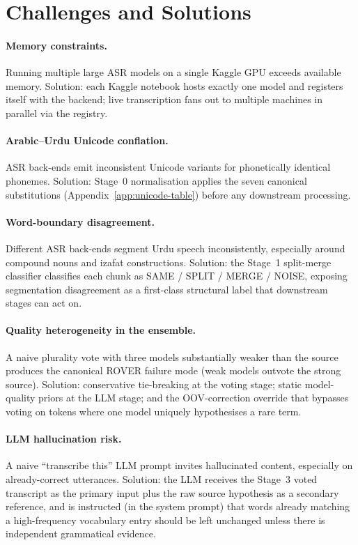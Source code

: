 \section{Challenges and Solutions}
\label{sec:challenges}

\paragraph{Memory constraints.}
Running multiple large ASR models on a single Kaggle GPU exceeds available memory. Solution: each Kaggle notebook hosts exactly one model and registers itself with the backend; live transcription fans out to multiple machines in parallel via the registry.

\paragraph{Arabic--Urdu Unicode conflation.}
ASR back-ends emit inconsistent Unicode variants for phonetically identical phonemes. Solution: Stage~0 normalisation applies the seven canonical substitutions (Appendix~\ref{app:unicode-table}) before any downstream processing.

\paragraph{Word-boundary disagreement.}
Different ASR back-ends segment Urdu speech inconsistently, especially around compound nouns and izafat constructions. Solution: the Stage~1 split-merge classifier classifies each chunk as SAME / SPLIT / MERGE / NOISE, exposing segmentation disagreement as a first-class structural label that downstream stages can act on.

\paragraph{Quality heterogeneity in the ensemble.}
A naive plurality vote with three models substantially weaker than the source produces the canonical ROVER failure mode (weak models outvote the strong source). Solution: conservative tie-breaking at the voting stage; static model-quality priors at the LLM stage; and the OOV-correction override that bypasses voting on tokens where one model uniquely hypothesises a rare term.

\paragraph{LLM hallucination risk.}
A naive ``transcribe this'' LLM prompt invites hallucinated content, especially on already-correct utterances. Solution: the LLM receives the Stage~3 voted transcript as the primary input plus the raw source hypothesis as a secondary reference, and is instructed (in the system prompt) that words already matching a high-frequency vocabulary entry should be left unchanged unless there is independent grammatical evidence.

